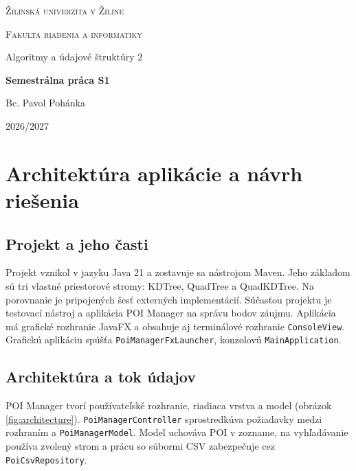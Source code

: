 \documentclass[12pt,a4paper,oneside]{report}
\begin{document}

\begin{titlepage}
    \centering
    {\scshape\Large Žilinská univerzita v Žiline\par}
    \vspace{0.4cm}
    {\scshape\large Fakulta riadenia a informatiky\par}
    \vspace{1.2cm}
    {\large Algoritmy a údajové štruktúry 2\par}
    \vfill
    {\LARGE\bfseries Semestrálna práca S1\par}
    \vfill
    \noindent
    \begin{minipage}[t]{0.49\textwidth}
        \raggedright
        {\large Bc. Pavol Pohánka}
    \end{minipage}
    \begin{minipage}[t]{0.49\textwidth}
        \raggedleft
        {\large 2026/2027}
    \end{minipage}
\end{titlepage}

\tableofcontents
\clearpage
{}

\chapter{Architektúra aplikácie a návrh riešenia}

\section{Projekt a jeho časti}
Projekt vznikol v jazyku Java 21 a zostavuje sa nástrojom Maven.
Jeho základom sú tri vlastné priestorové stromy: KDTree, QuadTree
a QuadKDTree. Na porovnanie je pripojených šesť externých implementácií.
Súčasťou projektu je testovací nástroj a aplikácia POI Manager na
správu bodov záujmu. Aplikácia má grafické rozhranie JavaFX a obsahuje
aj terminálové rozhranie \texttt{ConsoleView}. Grafickú aplikáciu
spúšťa \texttt{PoiManagerFxLauncher}, konzolovú \texttt{MainApplication}.

\section{Architektúra a tok údajov}

POI Manager tvorí používateľské rozhranie, riadiaca vrstva a model
(obrázok \ref{fig:architecture}). \texttt{PoiManager\allowbreak Controller}
sprostredkúva požiadavky medzi rozhraním a \texttt{PoiManager\allowbreak Model}.
Model uchováva POI v zozname, na vyhľadávanie používa zvolený strom
a prácu so súbormi CSV zabezpečuje cez \texttt{Poi\allowbreak Csv\allowbreak Repository}.
\end{document}
